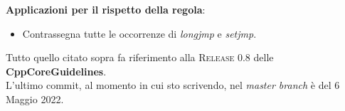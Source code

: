 \textsf{\small \textbf{Applicazioni per il rispetto della regola}: }

\begin{itemize}
	\item \textsf{\small Contrassegna tutte le occorrenze di \emph{longjmp} e \emph{setjmp}.}
\end{itemize}

\break

\fleuron

\textsf{\small Tutto quello citato sopra fa riferimento alla \textsc{Release 0.8} delle \textbf{CppCoreGuidelines}.} \\
\textsf{\small L'ultimo commit, al momento in cui sto scrivendo, nel \emph{master branch} è del 6 Maggio 2022.} \\ %

